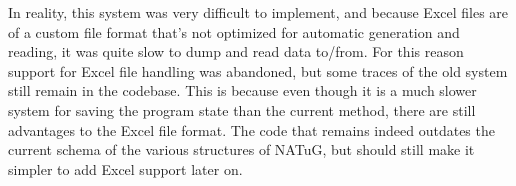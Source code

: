 \documentclass[titlepage]{article}
\begin{document}
	In reality, this system was very difficult to implement, and because Excel files are of a custom file format that's not optimized for automatic generation and reading, it was quite slow to dump and read data to/from. For this reason support for Excel file handling was abandoned, but some traces of the old system still remain in the codebase. This is because even though it is a much slower system for saving the program state than the current method, there are still advantages to the Excel file format. The code that remains indeed outdates the current schema of the various structures of NATuG, but should still make it simpler to add Excel support later on.
	
\end{document}

